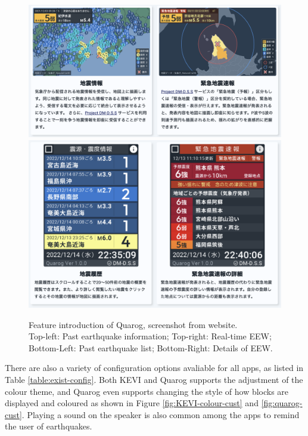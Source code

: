 \documentclass[10pt]{article}
\begin{document}
\begin{figure}[!ht]
    \centering

    \includegraphics[width=0.6\linewidth]{quarog-features-1.png}\\
    \includegraphics[width=0.6\linewidth]{quarog-features-2.png}
    \caption[Feature introduction of Quarog]{Feature introduction of Quarog, screenshot from website.\\Top-left: Past earthquake information; Top-right: Real-time EEW;\\Bottom-Left: Past earthquake list; Bottom-Right: Details of EEW.}
    \label{fig:quarog-monitor-features}
\end{figure}

There are also a variety of configuration options avaliable for all apps, as listed in Table \ref{table:exist-config}. Both KEVI and Quarog supports the adjustment of the colour theme, and Quarog even supports changing the style of how blocks are displayed and coloured as shown in Figure \ref{fig:KEVI-colour-cust} and \ref{fig:quarog-cust}. Playing a sound on the speaker is also common among the apps to remind the user of earthquakes.
\end{document}

